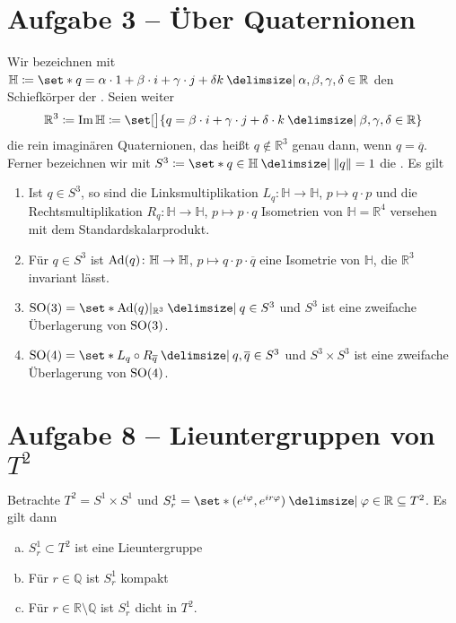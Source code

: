 \section{Aufgabe 3 -- Über Quaternionen} %
\label{sec:aufg3}
Wir bezeichnen mit $\mathbb{H} \coloneqq \set*{q = \alpha \cdot 1 + \beta \cdot i + \gamma \cdot j + \delta k \given \alpha, \beta, \gamma, \delta \in \mathbb{R}}$ den Schiefkörper der .
Seien weiter
\[
	\mathbb{R}^3 \coloneqq \Im \mathbb{H} \coloneqq \set[\big]{q = \beta \cdot i + \gamma \cdot j + \delta \cdot k \given \beta,\gamma,\delta \in \mathbb{R}}
\]
die rein imaginären Quaternionen, das heißt $q \notin \mathbb{R}^3$ genau dann, wenn $q = \overline{q}$.
Ferner bezeichnen wir mit $S^3 \coloneqq \set*{q \in \mathbb{H} \given \norm*{q}=1}$ die .
Es gilt
\begin{enumerate}[(1)]
	\item Ist $q \in S^3$, so sind die Linksmultiplikation $L_q \colon \mathbb{H} \to \mathbb{H}$, $p \mapsto q \cdot p$ und die Rechtsmultiplikation $R_q \colon \mathbb{H} \to \mathbb{H}$, $p \mapsto p \cdot q$ Isometrien von $\mathbb{H}=\mathbb{R}^4$ versehen mit dem Standardskalarprodukt.
	\item Für $q \in S^3$ ist $\operatorname{Ad}(q) \colon \mathbb{H} \to \mathbb{H}$, $p \mapsto q \cdot p \cdot \overline{q}$ eine Isometrie von $\mathbb{H}$, die $\mathbb{R}^3$ invariant lässt.
	\item $\SO(3) = \set*{\Ad(q)|_{\mathbb{R}^3} \given q \in S^3}$ und $S^3$ ist eine zweifache Überlagerung von $\operatorname{SO}(3)$.
	\item $\SO(4) = \set*{L_q \circ R_{\overline{q}} \given q,\overline{q} \in S^3}$ und $S^3 \times S^3$ ist eine zweifache Überlagerung von $\operatorname{SO}(4)$.
\end{enumerate}
\begin{beweis}
\end{beweis}

\section{Aufgabe 8 -- Lieuntergruppen von $T^2$} %
\label{sec:aufg8}
Betrachte $T^2= S^1 \times S^1$ und $S^1_r = \set*{(e^{i \varphi}, e^{i r \varphi}) \given \varphi \in \mathbb{R}} \subseteq T^2$.
Es gilt dann
\begin{enumerate}[a)]
	\item $S^1_r \subset T^2$ ist eine Lieuntergruppe
	\item Für $r \in \mathbb{Q}$ ist $S^1_r$ kompakt
	\item Für $r \in \mathbb{R} \setminus \mathbb{Q}$ ist $S^1_r$ dicht in $T^2$.
\end{enumerate}
\begin{beweis}
\end{beweis}

